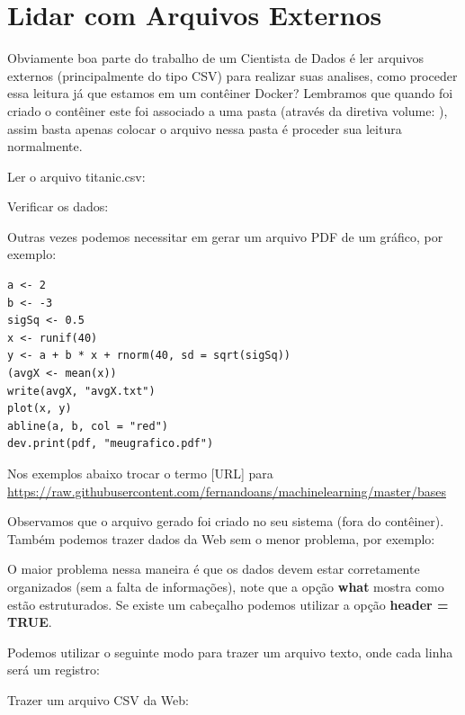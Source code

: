 \documentclass[a4paper,11pt]{article}
\begin{document}
\section{Lidar com Arquivos Externos}
Obviamente boa parte do trabalho de um Cientista de Dados é ler arquivos externos (principalmente do tipo CSV) para realizar suas analises, como proceder essa leitura já que estamos em um contêiner Docker? Lembramos que quando foi criado o contêiner este foi associado a uma pasta (através da diretiva volume: ), assim basta apenas colocar o arquivo nessa pasta é proceder sua leitura normalmente.

Ler o arquivo titanic.csv: \\

Verificar os dados: \\

Outras vezes podemos necessitar em gerar um arquivo PDF de um gráfico, por exemplo:
\begin{lstlisting}
a <- 2
b <- -3
sigSq <- 0.5
x <- runif(40)
y <- a + b * x + rnorm(40, sd = sqrt(sigSq))
(avgX <- mean(x))
write(avgX, "avgX.txt")
plot(x, y)
abline(a, b, col = "red")
dev.print(pdf, "meugrafico.pdf")
\end{lstlisting}

\begin{theo}[]{}
Nos exemplos abaixo trocar o termo [URL] para \\ \url{https://raw.githubusercontent.com/fernandoans/machinelearning/master/bases}
\end{theo}

Observamos que o arquivo gerado foi criado no seu sistema (fora do contêiner). Também podemos trazer dados da Web sem o menor problema, por exemplo: \\

O maior problema nessa maneira é que os dados devem estar corretamente organizados (sem a falta de informações), note que a opção \textbf{what} mostra como estão estruturados. Se existe um cabeçalho podemos utilizar a opção \textbf{header = TRUE}.

Podemos utilizar o seguinte modo para trazer um arquivo texto, onde cada linha será um registro:

Trazer um arquivo CSV da Web:
\end{document}
